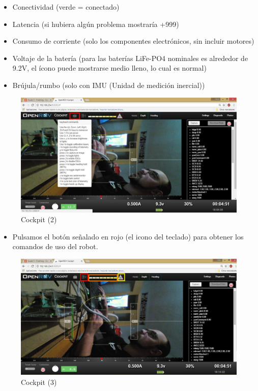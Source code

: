 \begin{itemize}
\item[\textcolor{red}{\textbullet}]Conectividad (verde = conectado)
\item[\textcolor{orange}{\textbullet}]Latencia (si hubiera algún problema mostraría +999)
\item[\textcolor{yellow}{\textbullet}]Consumo de corriente (solo los componentes electrónicos, sin incluir motores)
\item[\textcolor{green}{\textbullet}]Voltaje de la batería (para las baterías LiFe-PO4 nominales es alrededor de 9.2V, el ícono puede mostrarse medio lleno, lo cual es normal)
\item[\textcolor{blue}{\textbullet}]Brújula/rumbo (solo con IMU (Unidad de medición inercial))
\end{itemize}

\newpage
\begin{figure} [hbtp]
\begin{center}
  \includegraphics[width=12cm]{img/cap3/3_5/cockpit2}
\end{center}
\caption{Cockpit (2)}
\label{fig:cockpit2}
\end{figure}

\begin{itemize}
\item[\textcolor{red}{\textbullet}]Pulsamos el botón señalado en rojo (el icono del teclado) para obtener los comandos de uso del robot.
\end{itemize}


\begin{figure} [hbtp]
\begin{center}
  \includegraphics[width=12cm]{img/cap3/3_5/cockpit3}
\end{center}
\caption{Cockpit (3)}
\label{fig:cockpit3}
\end{figure}

